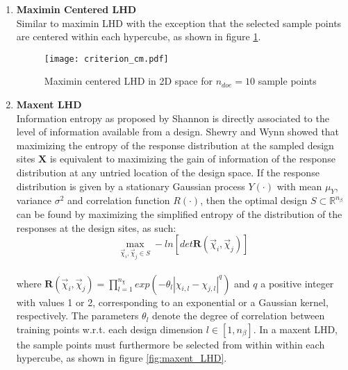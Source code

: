 \begin{enumerate}
\begin{enumerate}
\newpage


\item \textbf{Maximin Centered LHD} \\
Similar to maximin LHD with the exception that the selected sample 
points are centered within each hypercube, as shown in figure 
\ref{fig:maximin_centered_LHD}.

\vspace{-4mm}

\begin{figure}[h!]
    \centering
    \texttt{[image: criterion\_cm.pdf]}    
    \caption{Maximin centered LHD in 2D space for $n_{doe} = 10$ 
    sample points}
    \label{fig:maximin_centered_LHD}
\end{figure}

\item \textbf{Maxent LHD} \\
Information entropy as proposed by Shannon \cite{entropy} is 
directly associated to the level of information available from a 
design. Shewry and Wynn \cite{max_entropy} showed that maximizing 
the entropy of the response distribution at the sampled design 
sites $\mathbf{X}$ is equivalent to maximizing the gain of 
information of the response distribution at any untried location of 
the design space. If the response distribution is given by a 
stationary Gaussian process $Y(\cdot)$ with mean $μ_{Y}$, 
variance $σ^{2}$ and correlation function $R(\cdot)$, then the 
optimal design $S \!\subset \!\mathbb{R}^{n_{β}}$ can be found by 
maximizing the simplified entropy of the distribution of the 
responses at the design sites, as such:  
\begin{equation}
\max\limits_{\vec{χ}_{i}, \vec{χ}_{j} \in S} - 
ln\left[det\mathbf{R}(\vec{χ}_{i}, \vec{χ}_{j})\right]
\end{equation}
\\[-2mm]
where $\mathbf{R}(\vec{χ}_{i}, \vec{χ}_{j}) = \prod_{l=1}^{n_{χ}}
exp( -\theta_{l} \left| χ_{i,l} - χ_{j,l} \right|^{q})$ and $q$ a 
positive integer with values 1 or 2, corresponding to an 
exponential or a Gaussian kernel, respectively. The parameters 
$θ_{l}$ denote the degree of correlation between training points 
w.r.t. each design dimension $l \!\in \![1,n_{β}]$. In a maxent 
LHD, the sample points must furthermore be selected from within 
within each hypercube, as shown in figure \ref{fig:maxent_LHD}.

\vspace{-4mm}


\end{enumerate}
\end{enumerate}

